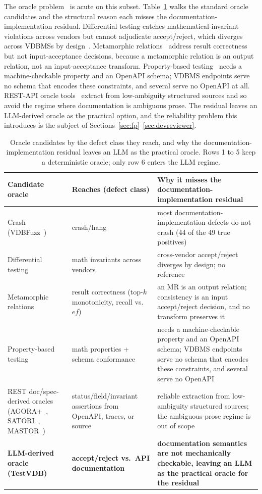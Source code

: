 \documentclass[sigconf]{acmart}
\begin{document}
The oracle problem~\cite{barr15} is acute on this subset. Table~\ref{tab:exclusion} walks the standard oracle candidates and the structural reason each misses the documentation-implementation residual. Differential testing catches mathematical-invariant violations across vendors but cannot adjudicate accept/reject, which diverges across VDBMSs by design~\cite{roadmap25}. Metamorphic relations~\cite{metmap24} address result correctness but not input-acceptance decisions, because a metamorphic relation is an output relation, not an input-acceptance transform. Property-based testing~\cite{claessen00} needs a machine-checkable property and an OpenAPI schema; VDBMS endpoints serve no schema that encodes these constraints, and several serve no OpenAPI at all. REST-API oracle tools~\cite{agoraplus25,satori25,mastor26} extract from low-ambiguity structured sources and so avoid the regime where documentation is ambiguous prose. The residual leaves an LLM-derived oracle as the practical option, and the reliability problem this introduces is the subject of Sections~\ref{sec:fp}--\ref{sec:devreviewer}.

\begin{table}[t]
\caption{Oracle candidates by the defect class they reach, and why the documentation-implementation residual leaves an LLM as the practical oracle. Rows 1 to 5 keep a deterministic oracle; only row 6 enters the LLM regime.}
\label{tab:exclusion}
\small
\begin{tabular}{@{}p{}p{}p{}@{}}
\toprule
Candidate oracle & Reaches (defect class) & Why it misses the documentation-implementation residual \\
\midrule
Crash (VDBFuzz~\cite{vdbfuzz26}) & crash/hang & most documentation-implementation defects do not crash (44 of the 49 true positives) \\
Differential testing & math invariants across vendors & cross-vendor accept/reject diverges by design; no reference~\cite{roadmap25} \\
Metamorphic relations~\cite{metmap24} & result correctness (top-$k$ monotonicity, recall vs.\ $ef$) & an MR is an output relation; consistency is an input accept/reject decision, and no transform preserves it \\
Property-based testing~\cite{claessen00,schemathesis,quickrest20} & math properties + schema conformance & needs a machine-checkable property and an OpenAPI schema; VDBMS endpoints serve no schema that encodes these constraints, and several serve no OpenAPI \\
REST doc/spec-derived oracles (AGORA+~\cite{agoraplus25}, SATORI~\cite{satori25}, MASTOR~\cite{mastor26}) & status/field/invariant assertions from OpenAPI, traces, or source & reliable extraction from low-ambiguity structured sources; the ambiguous-prose regime is out of scope \\
\textbf{LLM-derived oracle (TestVDB)} & \textbf{accept/reject vs.\ API documentation} & \textbf{documentation semantics are not mechanically checkable, leaving an LLM as the practical oracle for the residual} \\
\bottomrule
\end{tabular}
\end{table}
\end{document}
